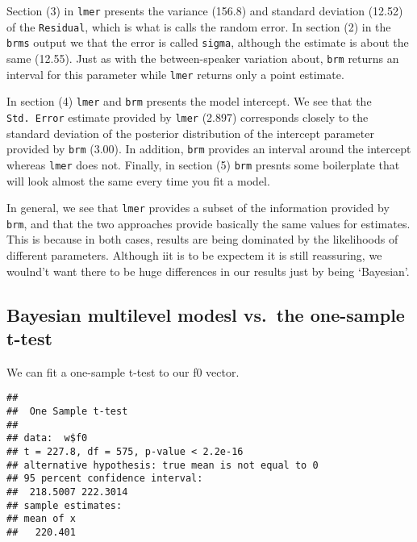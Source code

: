 \documentclass[
]{book}
\newenvironment{Shaded}{\begin{snugshade}}{\end{snugshade}}
\newcommand{\FunctionTok}[1]{\textcolor[rgb]{0.00,0.00,0.00}{#1}}
\newcommand{\NormalTok}[1]{#1}
\newcommand{\SpecialCharTok}[1]{\textcolor[rgb]{0.00,0.00,0.00}{#1}}
\begin{document}
Section (3) in \texttt{lmer} presents the variance (156.8) and standard deviation (12.52) of the \texttt{Residual}, which is what is calls the random error. In section (2) in the \texttt{brms} output we that the error is called \texttt{sigma}, although the estimate is about the same (12.55). Just as with the between-speaker variation about, \texttt{brm} returns an interval for this parameter while \texttt{lmer} returns only a point estimate.

In section (4) \texttt{lmer} and \texttt{brm} presents the model intercept. We see that the \texttt{Std.\ Error} estimate provided by \texttt{lmer} (2.897) corresponds closely to the standard deviation of the posterior distribution of the intercept parameter provided by \texttt{brm} (3.00). In addition, \texttt{brm} provides an interval around the intercept whereas \texttt{lmer} does not. Finally, in section (5) \texttt{brm} presnts some boilerplate that will look almost the same every time you fit a model.

In general, we see that \texttt{lmer} provides a subset of the information provided by \texttt{brm}, and that the two approaches provide basically the same values for estimates. This is because in both cases, results are being dominated by the likelihoods of different parameters. Although iit is to be expectem it is still reassuring, we woulnd't want there to be huge differences in our results just by being `Bayesian'.

\hypertarget{bayesian-multilevel-modesl-vs.-the-one-sample-t-test}{%
\subsection{Bayesian multilevel modesl vs.~the one-sample t-test}\label{bayesian-multilevel-modesl-vs.-the-one-sample-t-test}}

We can fit a one-sample t-test to our f0 vector.

\begin{Shaded}
\end{Shaded}

\begin{verbatim}
## 
##  One Sample t-test
## 
## data:  w$f0
## t = 227.8, df = 575, p-value < 2.2e-16
## alternative hypothesis: true mean is not equal to 0
## 95 percent confidence interval:
##  218.5007 222.3014
## sample estimates:
## mean of x 
##   220.401
\end{verbatim}
\end{document}
